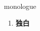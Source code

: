 
\begin{frame}
{\huge monologue}
\begin{center}
\begin{enumerate}\Large
  \item \textbf{独白}
\end{enumerate}
\end{center}
\end{frame}
